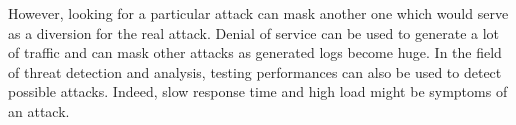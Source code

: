 However, looking for a particular attack can mask another one which would serve
as a diversion for the real attack. Denial of service can be used to generate a
lot of traffic and can mask other attacks as generated logs become huge. In the
field of threat detection and analysis, testing performances can also be used
to detect possible attacks. Indeed, slow response time and high load might be
symptoms of an attack.

